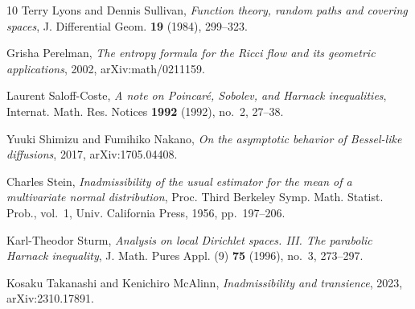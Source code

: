 \documentclass[11pt]{amsart}
\theoremstyle{plain}
\theoremstyle{definition}
\theoremstyle{remark}
\begin{document}
{\begin{thebibliography}{10}
Terry Lyons and Dennis Sullivan, \emph{Function theory, random paths and
  covering spaces}, J. Differential Geom. \textbf{19} (1984), 299--323.

Grisha Perelman, \emph{The entropy formula for the {R}icci flow and its
  geometric applications}, 2002, arXiv:math/0211159.

Laurent Saloff-Coste, \emph{A note on {P}oincar\'e, {S}obolev, and {H}arnack
  inequalities}, Internat. Math. Res. Notices \textbf{1992} (1992), no.~2,
  27--38.

Yuuki Shimizu and Fumihiko Nakano, \emph{On the asymptotic behavior of
  {B}essel-like diffusions}, 2017, arXiv:1705.04408.

Charles Stein, \emph{Inadmissibility of the usual estimator for the mean of a
  multivariate normal distribution}, Proc. Third Berkeley Symp. Math. Statist.
  Prob., vol.~1, Univ. California Press, 1956, pp.~197--206.

Karl-Theodor Sturm, \emph{Analysis on local {D}irichlet spaces. {III}. {T}he
  parabolic {H}arnack inequality}, J. Math. Pures Appl. (9) \textbf{75} (1996),
  no.~3, 273--297.

Kosaku Takanashi and Kenichiro McAlinn, \emph{Inadmissibility and transience},
  2023, arXiv:2310.17891.

\end{thebibliography}
}
\end{document}
